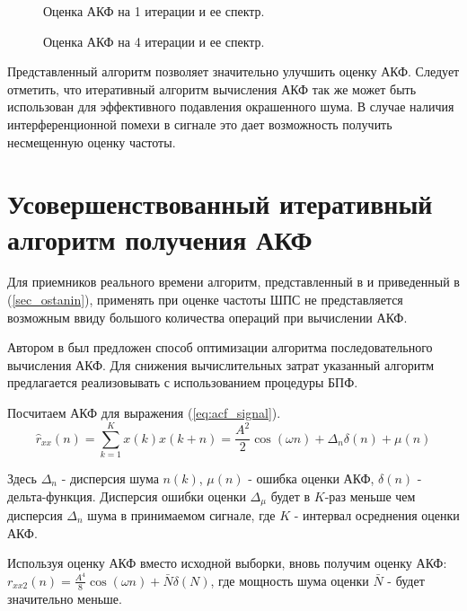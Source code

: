 \begin{figure}[h]
	\center{}
	\caption{Оценка АКФ на 1 итерации и ее спектр.}
	\label{pic:acf_1_iter}
\end{figure}

\begin{figure}[h]
	\center{}
	\caption{Оценка АКФ на 4 итерации и ее спектр.}
	\label{pic:acf_4_iter}
\end{figure}

Представленный алгоритм позволяет значительно улучшить оценку АКФ. Следует отметить, что итеративный алгоритм вычисления АКФ так же
может быть использован для эффективного подавления окрашенного шума. В случае наличия интерференционной помехи в сигнале это дает
возможность получить несмещенную оценку частоты.

\section{Усовершенствованный итеративный алгоритм получения АКФ}
\label{sec_acf_fft}
Для приемников реального времени алгоритм, представленный в \cite{ostanin_akf} и приведенный в (\ref{sec_ostanin}), применять при оценке 
частоты ШПС не представляется возможным ввиду большого количества операций при вычислении АКФ.

Автором в \cite{my_acf} был предложен способ оптимизации алгоритма последовательного вычисления АКФ.
Для снижения вычислительных затрат указанный алгоритм предлагается реализовывать с использованием процедуры БПФ. 

Посчитаем АКФ для выражения (\ref{eq:acf_signal}).
\begin{equation}
	\label{eq:lpc_akf_n}
	\hat{r}_{xx}(n) = \sum \limits_{k=1}^{K} x(k)x(k+n) = \frac{A^2}{2} \cos{(\omega{n})} + \Delta_n \delta{(n)} + \mu{(n)}
\end{equation}

Здесь ${\Delta_n}$ - дисперсия шума ${n(k)}$, ${\mu{(n)}}$ - ошибка оценки АКФ, ${\delta{(n)}}$ - дельта-функция. Дисперсия ошибки
оценки ${\Delta_{\mu}}$ будет в ${K}$-раз меньше чем дисперсия ${\Delta_n}$ шума в принимаемом сигнале, где ${K}$ - интервал
осреднения оценки АКФ.

Используя оценку АКФ вместо исходной выборки, вновь получим оценку АКФ:
${r_{xx2}(n) = \frac{A^4}{8} \cos{(\omega n)} + \bar{N} \delta{(N)}}$,
где мощность шума оценки ${\bar{N}}$ - будет значительно меньше.

